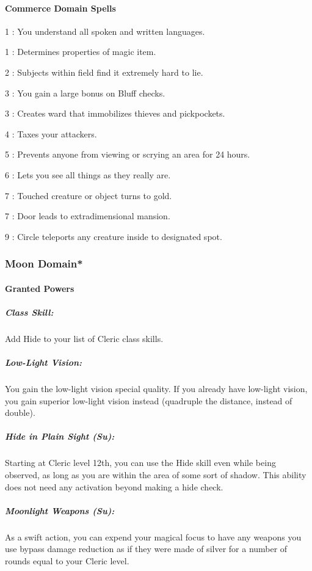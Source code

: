 \paragraph{Commerce Domain Spells}
\begin{list}{}{\leftmargin=1em}
\item[1] : You understand all spoken and written languages.
\item[1] : Determines properties of magic item.
\item[2] : Subjects within field find it extremely hard to lie.
\item[3] : You gain a large bonus on Bluff checks.
\item[3] : Creates ward that immobilizes thieves and pickpockets.
\item[4] : Taxes your attackers.
\item[5] : Prevents anyone from viewing or scrying an area for 24 hours.
\item[6] : Lets you see all things as they really are.
\item[7] : Touched creature or object turns to gold.
\item[7] : Door leads to extradimensional mansion.
\item[9] : Circle teleports any creature inside to designated spot.
\end{list}
\subsubsection[Moon Domain]{Moon Domain*}
\paragraph{Granted Powers}
\subparagraph{Class Skill:}
Add Hide to your list of Cleric class skills.
\subparagraph{Low-Light Vision:} You gain the low-light vision special quality. If you already have low-light vision, you gain superior low-light vision instead (quadruple the distance, instead of double).
\subparagraph{Hide in Plain Sight (Su):} Starting at Cleric level 12th, you can use the Hide skill even while being observed, as long as you are within the area of some sort of shadow.
This ability does not need any activation beyond making a hide check.
\subparagraph{Moonlight Weapons (Su):}
As a swift action, you can expend your magical focus to have any weapons you use bypass damage reduction as if they were made of silver for a number of rounds equal to your Cleric level.

